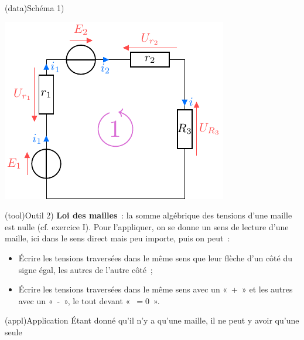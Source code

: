 \documentclass[../../main/main.tex]{subfiles}
\begin{document}
{}{
  \begin{enumerate}
\begin{tcbraster}[raster columns=5, raster equal height=rows]
    \begin{tcb}[raster multicolumn=2](data){Schéma}
        1)\vspace*{-20pt}
        \begin{center}
            \includegraphics{assogen_ser}
        \end{center}
    \end{tcb}
    \begin{tcb}[raster multicolumn=3](tool){Outil}
        2)
        \textbf{Loi des mailles}~: la somme algébrique des tensions d'une maille
        est nulle (cf. exercice I). Pour l'appliquer, on se donne un
        sens de lecture d'une maille, ici dans le sens direct mais peu importe,
        puis on peut~:
        \begin{itemize}
            \item Écrire les tensions traversées dans le même sens que leur
                flèche d'un côté du signe égal, les autres de l'autre côté~;
            \item Écrire les tensions traversées dans le même sens avec un «~+~»
                et les autres avec un «~-~», le tout devant «~$=0$~».
        \end{itemize}
    \end{tcb}
\end{tcbraster}
\begin{tcbraster}[raster columns=9, raster equal height=rows]
    \begin{tcb}[raster multicolumn=4](appl){Application}
        Étant donné qu'il n'y a qu'une maille, il ne peut y avoir qu'une seule

\end{tcb}
\end{tcbraster}
\end{enumerate}}
\end{document}
